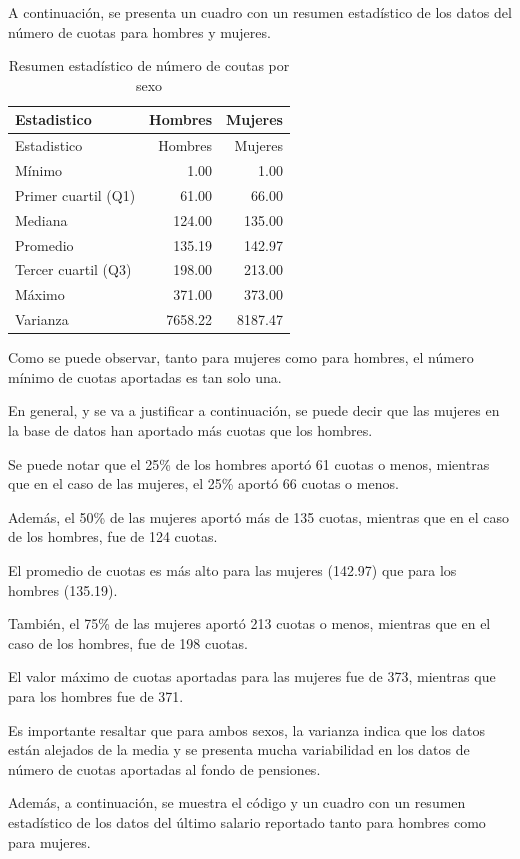 \documentclass[
]{article}
\begin{document}
A continuación, se presenta un cuadro con un resumen estadístico de los
datos del número de cuotas para hombres y mujeres.

\begin{longtable}[]{@{}lrr@{}}
\caption{Resumen estadístico de número de coutas por
sexo}\tabularnewline
\toprule\noalign{}
Estadistico & Hombres & Mujeres \\
\midrule\noalign{}
\endfirsthead
\toprule\noalign{}
Estadistico & Hombres & Mujeres \\
\midrule\noalign{}
\endhead
\bottomrule\noalign{}
\endlastfoot
Mínimo & 1.00 & 1.00 \\
Primer cuartil (Q1) & 61.00 & 66.00 \\
Mediana & 124.00 & 135.00 \\
Promedio & 135.19 & 142.97 \\
Tercer cuartil (Q3) & 198.00 & 213.00 \\
Máximo & 371.00 & 373.00 \\
Varianza & 7658.22 & 8187.47 \\
\end{longtable}

Como se puede observar, tanto para mujeres como para hombres, el número
mínimo de cuotas aportadas es tan solo una.

En general, y se va a justificar a continuación, se puede decir que las
mujeres en la base de datos han aportado más cuotas que los hombres.

Se puede notar que el 25\% de los hombres aportó 61 cuotas o menos,
mientras que en el caso de las mujeres, el 25\% aportó 66 cuotas o
menos.

Además, el 50\% de las mujeres aportó más de 135 cuotas, mientras que en
el caso de los hombres, fue de 124 cuotas.

El promedio de cuotas es más alto para las mujeres (142.97) que para los
hombres (135.19).

También, el 75\% de las mujeres aportó 213 cuotas o menos, mientras que
en el caso de los hombres, fue de 198 cuotas.

El valor máximo de cuotas aportadas para las mujeres fue de 373,
mientras que para los hombres fue de 371.

Es importante resaltar que para ambos sexos, la varianza indica que los
datos están alejados de la media y se presenta mucha variabilidad en los
datos de número de cuotas aportadas al fondo de pensiones.

Además, a continuación, se muestra el código y un cuadro con un resumen
estadístico de los datos del último salario reportado tanto para hombres
como para mujeres.
\end{document}
